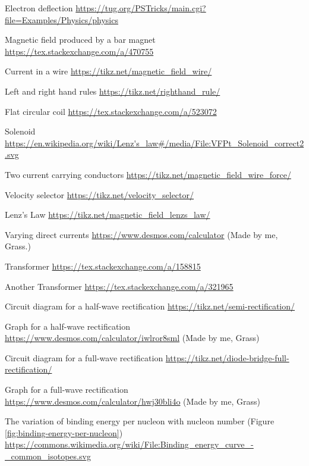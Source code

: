 \documentclass[oneside]{book}
\begin{document}
\begin{enumerate}[label={[\arabic*]}]
    \item\label{Electron deflection} Electron deflection \url{https://tug.org/PSTricks/main.cgi?file=Examples/Physics/physics}
    \item\label{Magnetic field produced by a bar magnet} Magnetic field produced by a bar magnet \url{https://tex.stackexchange.com/a/470755} 
    \item\label{Current in a wire} Current in a wire \url{https://tikz.net/magnetic_field_wire/}
    \item\label{Left and right hand rules} Left and right hand rules \url{https://tikz.net/righthand_rule/}
    \item\label{Flat circular coil} Flat circular coil \url{https://tex.stackexchange.com/a/523072}
    \item\label{Solenoid} Solenoid \url{https://en.wikipedia.org/wiki/Lenz's_law#/media/File:VFPt_Solenoid_correct2.svg}
    \item\label{Two current carrying conductors} Two current carrying conductors \url{https://tikz.net/magnetic_field_wire_force/}
    \item\label{Velocity selector} Velocity selector \url{https://tikz.net/velocity_selector/}
    \item\label{Lenz's Law} Lenz's Law \url{https://tikz.net/magnetic_field_lenzs_law/}
    \item\label{Varying direct current} Varying direct currents \url{https://www.desmos.com/calculator} (Made by me, Grass.)
    \item\label{Transformer} Transformer \url{https://tex.stackexchange.com/a/158815}
    \item\label{Another Transformer} Another Transformer \url{https://tex.stackexchange.com/a/321965}
    \item\label{Half-Wave-Recification-Circuit} Circuit diagram for a half-wave rectification \url{https://tikz.net/semi-rectification/}
    \item\label{Half-Wave-Recification-Graph} Graph for a half-wave rectification \url{https://www.desmos.com/calculator/iwlror8sml} (Made by me, Grass)
    \item\label{Full-Wave-Rectificaion-Circuit} Circuit diagram for a full-wave rectification \url{https://tikz.net/diode-bridge-full-rectification/}
    \item\label{Full-Wave-Rectification-Graph} Graph for a full-wave rectification \url{https://www.desmos.com/calculator/hwj30bli4o} (Made by me, Grass)
    \item\label{source:binding-energy-per-nucleon} The variation of binding energy per nucleon with nucleon number (Figure \ref{fig:binding-energy-per-nucleon}) \url{https://commons.wikimedia.org/wiki/File:Binding_energy_curve_-_common_isotopes.svg}

\end{enumerate}
\end{document}
